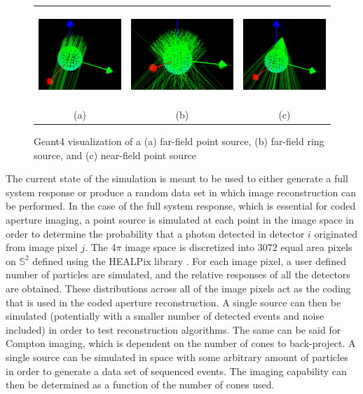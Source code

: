 \documentclass[10pt]{article}
\begin{document}
\begin{figure}[htb!]
\hypertarget{fig2}{}
\centering
\begin{tabular}{ccc}
	\includegraphics[height=100pt]{Figures/FarFieldVis.png} & 
	\includegraphics[height=100pt]{Figures/FarFieldRingVis.png} & 
	\includegraphics[height=100pt]{Figures/NearFieldVis.png} \\ [-0.5ex]
	\scriptsize{(a)} & \scriptsize{(b)} & \scriptsize{(c)}
\end{tabular}
\caption{Geant4 visualization of a (a) far-field point source, (b) far-field ring source, and (c) near-field point source}
\end{figure}


The current state of the simulation is meant to be used to either generate a full system response or produce a random data set in which image reconstruction can be performed. In the case of the full system response, which is essential for coded aperture imaging, a point source is simulated at each point in the image space in order to determine the probability that a photon detected in detector $i$ originated from image pixel $j$. The 4$\pi$ image space is discretized into 3072 equal area pixels on $\mathbb{S}^2$ defined using the HEALPix library \cite{Healpix2005}. For each image pixel, a user defined number of particles are simulated, and the relative responses of all the detectors are obtained. These distributions across all of the image pixels act as the coding that is used in the coded aperture reconstruction. A single source can then be simulated (potentially with a smaller number of detected events and noise included) in order to test reconstruction algorithms. The same can be said for Compton imaging, which is dependent on the number of cones to back-project. A single source can be simulated in space with some arbitrary amount of particles in order to generate a data set of sequenced events. The imaging capability can then be determined as a function of the number of cones used.
\end{document}
